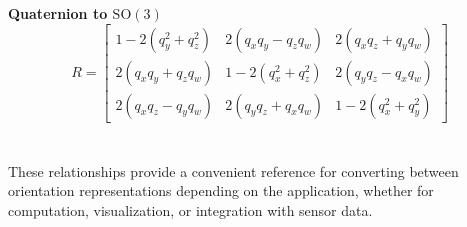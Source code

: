 \textbf{Quaternion to $\mathrm{SO}(3)$}
$$
    R =
    \begin{bmatrix}
        1 - 2(q_y^2 + q_z^2) & 2(q_x q_y - q_z q_w) & 2(q_x q_z + q_y q_w) \\
        2(q_x q_y + q_z q_w) & 1 - 2(q_x^2 + q_z^2) & 2(q_y q_z - q_x q_w) \\
        2(q_x q_z - q_y q_w) & 2(q_y q_z + q_x q_w) & 1 - 2(q_x^2 + q_y^2)
    \end{bmatrix}
$$
\\ \\
\noindent
These relationships provide a convenient reference for converting between orientation representations depending on the application, whether for computation, visualization, or integration with sensor data.
